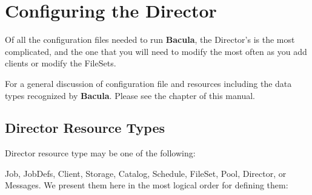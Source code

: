 
\section*{Configuring the Director}
\label{_ChapterStart40}

Of all the configuration files needed to run {\bf Bacula}, the Director's is
the most complicated, and the one that you will need to modify the most often
as you add clients or modify the FileSets. 

For a general discussion of configuration file and resources including the
data types recognized by {\bf Bacula}. Please see the 
 chapter of this manual. 

\subsection*{Director Resource Types}

Director resource type may be one of the following: 

Job, JobDefs, Client, Storage, Catalog, Schedule, FileSet, Pool, Director,  or
Messages. We present them here in the most logical order for defining them: 

